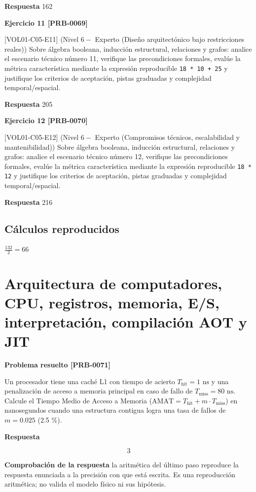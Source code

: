 \documentclass{book}
\begin{document}
\noindent\textbf{Respuesta} 162

\noindent\textbf{Ejercicio 11 [PRB-0069]}

[VOL01-C05-E11] (Nivel \(6 -\) Experto (Diseño arquitectónico bajo restricciones reales)) Sobre álgebra booleana, inducción estructural, relaciones y grafos: analice el escenario técnico número 11, verifique las precondiciones formales, evalúe la métrica característica mediante la expresión reproducible \texttt{18 * 10 + 25} y justifique los criterios de aceptación, pistas graduadas y complejidad temporal/espacial.

\noindent\textbf{Respuesta} 205

\noindent\textbf{Ejercicio 12 [PRB-0070]}

[VOL01-C05-E12] (Nivel \(6 -\) Experto (Compromisos técnicos, escalabilidad y mantenibilidad)) Sobre álgebra booleana, inducción estructural, relaciones y grafos: analice el escenario técnico número 12, verifique las precondiciones formales, evalúe la métrica característica mediante la expresión reproducible \texttt{18 * 12} y justifique los criterios de aceptación, pistas graduadas y complejidad temporal/espacial.

\noindent\textbf{Respuesta} 216

\subsection*{Cálculos reproducidos}

\(\frac{132}{2} = 66\)

\section{Arquitectura de computadores, CPU, registros, memoria, E/S, interpretación, compilación AOT y JIT}

\noindent\textbf{Problema resuelto [PRB-0071]}

Un procesador tiene una caché L1 con tiempo de acierto \(T_{\text{hit}} = 1\text{ ns}\) y una penalización de acceso a memoria principal en caso de fallo de \(T_{\text{miss}} = 80\text{ ns}\). Calcule el Tiempo Medio de Acceso a Memoria (\(\text{AMAT} = T_{\text{hit}} + m \cdot T_{\text{miss}}\)) en nanosegundos cuando una estructura contigua logra una tasa de fallos de \(m = 0.025\) (2.5 \%).

\noindent\textbf{Respuesta}

\[
3
\]

\noindent\textbf{Comprobación de la respuesta} la aritmética del último paso reproduce la respuesta enunciada a la precisión con que está escrita. Es una reproducción aritmética; no valida el modelo físico ni sus hipótesis.
\end{document}

